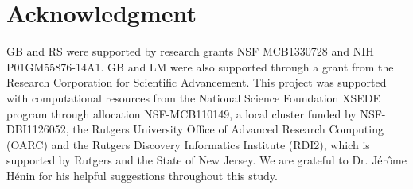 \documentclass[final,3p,times,twocolumn]{elsarticle}
\begin{document}
 \section{Acknowledgment}
GB and RS were supported by research grants NSF MCB1330728 and NIH P01GM55876-14A1. GB and LM were also supported through a grant from the Research Corporation for Scientific Advancement. This project was supported with computational resources from the National Science Foundation XSEDE program through allocation NSF-MCB110149, a local cluster funded by NSF-DBI1126052, the Rutgers University Office of Advanced Research Computing (OARC) and the Rutgers Discovery Informatics Institute (RDI2), which is supported by Rutgers and the State of New Jersey. We are grateful to Dr. J\'{e}r\^{o}me H\'{e}nin for his helpful suggestions throughout this study.  






\end{document}
